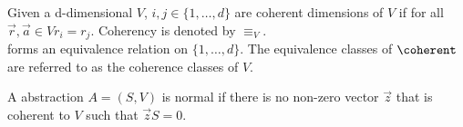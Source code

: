 \begin{mydef}
Given a d-dimensional \qvasr $\mathit{V}$,  $i, j \in \{1 ,\ldots, d\}$ are coherent dimensions of $\mathit{V}$ if for all $\vec{r}, \vec{a} \in \mathit{V} r_i = r_j$. Coherency is denoted by $\equiv_{\mathit{V}}$. \\
\coherent forms an equivalence relation on $\{1, \ldots, d\}$. The equivalence classes of $\coherent$ are referred to as the coherence classes of $\mathit{V}$.
\end{mydef}

\begin{mydef}
A \qvasr abstraction $\mathit{A = (S, V)}$ is normal if there is no non-zero vector $\vec{z}$ that is coherent to $\mathit{V}$ such that $\vec{z}S = 0$.
\end{mydef}

\begin{example}
    
\end{example}